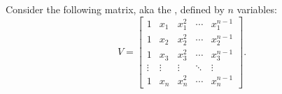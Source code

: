 Consider the following matrix, aka the ,
defined by $n$ variables:
\begin{equation*}
    V=\begin{bmatrix}
      1& x_1 & x_1^2 & \cdots & x_1^{n-1}\\
      1 & x_2 & x_2^2 & \cdots & x_2^{n-1}\\
      1 & x_3 & x_3^2 & \cdots & x_3^{n-1}\\
      \vdots & \vdots & \vdots & \ddots &\vdots \\
      1 & x_n & x_n^2 & \cdots & x_n^{n-1}
    \end{bmatrix}.
\end{equation*}

\newcommand{\highlight}[1]{%
   \colorbox{red!25}{$\displaystyle#1$}}

